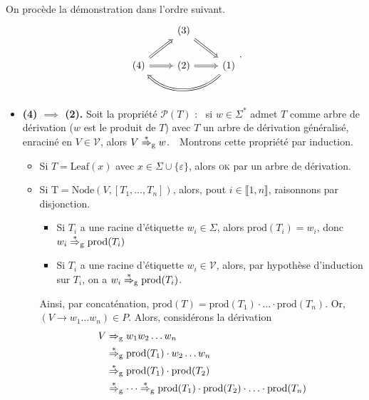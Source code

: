 \begin{prv}
	On procède la démonstration dans l'ordre suivant.
	\[
		\begin{tikzcd}
			&\text{(3)}\ar[dr, Rightarrow]&\\
			\text{(4)}\ar[ur, Rightarrow] \ar[r, Rightarrow]&\text{(2)}\ar[r, Rightarrow]& \text{(1)} \ar[ll, Rightarrow, bend left=45]\\
		\end{tikzcd}
	.\]
	\begin{itemize}
		\item\textbf{(4) $\implies$ (2).}
			Soit la propriété $\mathcal{P}(T)$ : \guillemotleft~si $w \in \Sigma^*$ admet $T$ comme arbre de dérivation ($w$ est le produit de $T$) avec $T$ un arbre de dérivation généralisé, enraciné en $V \in \mathcal{V}$, alors $V \mathrel{\overset*\Rightarrow} _\mathrm{g} w$.~\guillemotright\ 
			Montrons cette propriété par induction.
			\begin{itemize}
				\item Si $T = \mathrm{Leaf}(x)$ avec $x \in \Sigma \cup \{\varepsilon\}$, alors \textsc{ok} par un arbre de dérivation.
				\item Si $\mathrm{T} = \mathrm{Node}(V, [T_1, \ldots, T_n])$, alors, pout $i \in \llbracket 1,n \rrbracket$, raisonnons par disjonction.
					\begin{itemize}
						\item Si $T_i$ a une racine d'étiquette $w_i \in \Sigma$, alors $\mathrm{prod}(T_i) = w_i$, donc $w_i \mathrel{\overset*\Rightarrow} _\mathrm{g} \mathrm{prod}(T_i)$
						\item Si $T_i$ a une racine d'étiquette $w_i \in \mathcal{V}$, alors, par hypothèse d'induction sur $T_i$, on a $w_i \mathrel{\overset*\Rightarrow} _\mathrm{g} \mathrm{prod}(T_i)$.
					\end{itemize}
					Ainsi, par concaténation, $\mathrm{prod}(T) = \mathrm{prod}(T_1) \cdot \ldots \cdot \mathrm{prod}(T_n)$.
					Or, $(V \to w_1 \ldots w_n) \in P$.
					Alors, considérons la dérivation
					\begin{align*}
						V &\Rightarrow_\mathrm{g} w_1w_2\ldots w_n\\
							&\mathrel{\overset*\Rightarrow} _\mathrm{g} \mathrm{prod}(T_1) \cdot w_2 \ldots w_n\\
							&\mathrel{\overset*\Rightarrow} _\mathrm{g} \mathrm{prod}(T_1) \cdot \mathrm{prod}(T_2)\\
							&\mathrel{\overset*\Rightarrow} _\mathrm{g} \cdots \mathrel{\overset*\Rightarrow} _\mathrm{g} \mathrm{prod}(T_1) \cdot \mathrm{prod}(T_2) \cdot \ldots \cdot  \mathrm{prod}(T_n)
					\end{align*}
			\end{itemize}

\end{itemize}
\end{prv}
